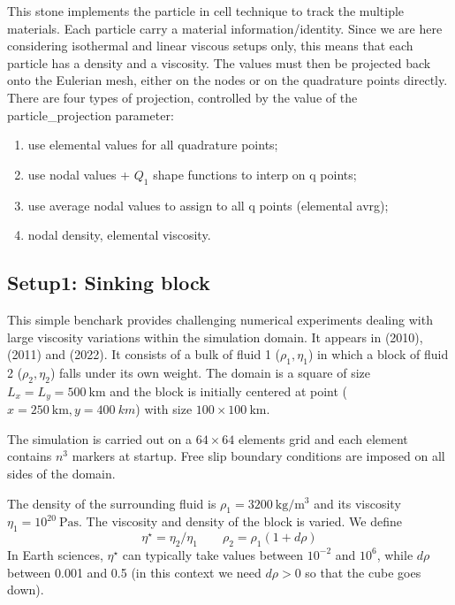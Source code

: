 This stone implements the particle in cell technique to track the multiple materials.
Each particle carry a material information/identity. Since we are here considering 
isothermal and linear viscous setups only, this means that each particle has a density
and a viscosity. The values must then be projected back onto the Eulerian mesh, either 
on the nodes or on the quadrature points directly.
There are four types of projection, controlled by the value of the 
{\python particle\_projection} parameter:
\begin{enumerate}
\item  use elemental values for all quadrature points;
\item  use nodal values + $Q_1$ shape functions to interp on q points;
\item  use average nodal values to assign to all q points (elemental avrg);
\item  nodal density, elemental viscosity.
\end{enumerate}

\subsection*{Setup1: Sinking block} 

This simple benchark provides challenging numerical experiments dealing with large viscosity variations 
within the simulation domain. It appears in \textcite{gery10} (2010), \textcite{thie11} (2011) and
\textcite{thba22} (2022). It consists of a bulk of fluid 1 ($\rho_1,\eta_1$)
in which a block of fluid 2 ($\rho_2,\eta_2$) falls under its own weight.
The domain is a square of size $L_x=L_y=500~\si{\km}$ and the block is initially centered at 
point ($x=250~\si{\km},y=400~\si{km}$) with size $100\times100~\si{\km}$. 

The simulation is carried out on a $64\times64$ elements grid and each element contains $n^3$ markers
at startup. Free slip boundary conditions are imposed on all sides of the domain. 

The density of the surrounding fluid is $\rho_1=3200~\si{\kg\per\cubic\meter}$
and its viscosity $\eta_1=10^{20}~\si{\pascal\second}$.
The viscosity and density of the block is varied. We define
\[
\eta^\star=\eta_2/\eta_1
\quad\quad
\rho_2=\rho_1 (1 + d\rho)
\]
In Earth sciences, $\eta^\star$ can typically take values between $10^{-2}$ and $10^6$,
while $d\rho$ between 0.001 and 0.5 (in this context we need $d\rho>0$ so that the cube 
goes down).

